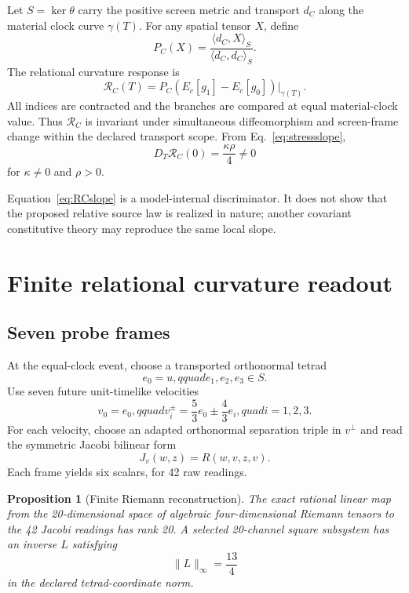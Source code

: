 \documentclass[11pt]{article}
\newtheorem{proposition}[theorem]{Proposition}
\theoremstyle{definition}
\theoremstyle{remark}
\newcommand{\Ker}{\operatorname{ker}}
\newcommand{\RC}{\mathcal{R}_{C}}
\begin{document}
Let $S=\Ker\theta$ carry the positive screen metric and transport $d_C$ along the material clock curve $\gamma(T)$. For any spatial tensor $X$, define
\begin{equation}
  P_C(X)=\frac{\langle d_C,X\rangle_S}{\langle d_C,d_C\rangle_S}.
\end{equation}
The relational curvature response is
\begin{equation}\label{eq:RC}
  \RC(T)=P_C\!\left(E_c[g_1]-E_c[g_0]\right)\big|_{\gamma(T)}.
\end{equation}
All indices are contracted and the branches are compared at equal material-clock value. Thus $\RC$ is invariant under simultaneous diffeomorphism and screen-frame change within the declared transport scope. From Eq.~\eqref{eq:stressslope},
\begin{equation}\label{eq:RCslope}
  D_T\RC(0)=\frac{\kappa\rho}{4}\ne0
\end{equation}
for $\kappa\ne0$ and $\rho>0$.

Equation~\eqref{eq:RCslope} is a model-internal discriminator. It does not show that the proposed relative source law is realized in nature; another covariant constitutive theory may reproduce the same local slope.

\section{Finite relational curvature readout}

\subsection{Seven probe frames}

At the equal-clock event, choose a transported orthonormal tetrad
\begin{equation}
  e_0=u,qquad e_1,e_2,e_3\in S.
\end{equation}
Use seven future unit-timelike velocities
\begin{equation}
  v_0=e_0,qquad
  v_i^{\pm}=\frac53e_0\pm\frac43e_i,quad i=1,2,3.
\end{equation}
For each velocity, choose an adapted orthonormal separation triple in $v^\perp$ and read the symmetric Jacobi bilinear form
\begin{equation}
  J_v(w,z)=R(w,v,z,v).
\end{equation}
Each frame yields six scalars, for 42 raw readings.

\begin{proposition}[Finite Riemann reconstruction]\label{prop:detector}
The exact rational linear map from the 20-dimensional space of algebraic four-dimensional Riemann tensors to the 42 Jacobi readings has rank 20. A selected 20-channel square subsystem has an inverse $L$ satisfying
\begin{equation}
  \|L\|_\infty=\frac{13}{4}
\end{equation}
in the declared tetrad-coordinate norm.
\end{proposition}
\end{document}
